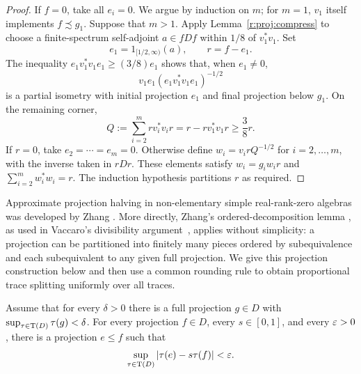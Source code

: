 \begin{proof}
If $f=0$, take all $e_i=0$.  We argue by induction on $m$; for $m=1$,
$v_1$ itself implements $f\precsim g_1$.  Suppose that $m>1$.
Apply Lemma~\ref{r:proj:compress} to choose a finite-spectrum self-adjoint
$a\in fDf$ within $1/8$ of $v_1^*v_1$.  Set
\[
  e_1=1_{[1/2,\infty)}(a),\qquad r=f-e_1.
\]
The inequality $e_1v_1^*v_1e_1\ge(3/8)e_1$ shows that, when $e_1\ne0$,
\[
  v_1e_1(e_1v_1^*v_1e_1)^{-1/2}
\]
is a partial isometry with initial projection $e_1$ and final projection
below $g_1$.  On the remaining corner,
\[
  Q:=\sum_{i=2}^m r v_i^*v_i r
    =r-rv_1^*v_1r\ge\frac38r.
\]
If $r=0$, take $e_2=\cdots=e_m=0$.  Otherwise define
$w_i=v_i r Q^{-1/2}$ for $i=2,\ldots,m$, with the inverse taken in $rDr$.
These elements satisfy $w_i=g_iw_i r$ and
$\sum_{i=2}^m w_i^*w_i=r$.  The induction hypothesis partitions $r$ as
required.
\end{proof}

Approximate projection halving in non-elementary simple real-rank-zero
algebras was developed by Zhang \cite[Theorem~1.1(i)]{Zhang1991}.
More directly, Zhang's ordered-decomposition lemma
\cite[Lemma~1.1]{Zhang1990}, as used in Vaccaro's divisibility
argument~\cite[Lemma~2.1, version~1]{Vac26}, applies without
simplicity: a projection can be
partitioned into finitely many pieces ordered by subequivalence and each
subequivalent to any given full projection. We give this projection
construction below and then use a common rounding rule to obtain
proportional trace splitting uniformly over all traces.

\begin{proposition}\label{r:proj:split}
Assume that for every $\delta>0$ there is a full projection $g\in D$ with
$\sup_{\tau\in\operatorname T(D)}\tau(g)<\delta$.
For every projection $f\in D$, every $s\in[0,1]$, and every $\varepsilon>0$,
there is a projection $e\le f$ such that
\begin{equation}\label{r:proj:split-estimate}
  \sup_{\tau\in\operatorname T(D)}|\tau(e)-s\tau(f)|<\varepsilon.
\end{equation}
\end{proposition}

